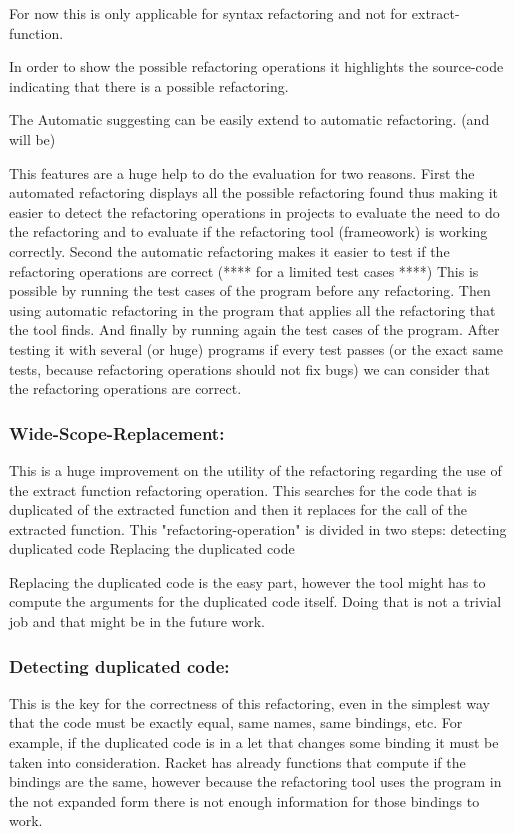 For now this is only applicable for syntax refactoring and not for extract-function.

In order to show the possible refactoring operations it highlights the source-code indicating
that there is a possible refactoring.

The Automatic suggesting can be easily extend to automatic refactoring. (and will be)

This features are a huge help to do the evaluation for two reasons.
First the automated refactoring displays all the possible refactoring found thus making it easier
to detect the refactoring operations in projects to evaluate the need to do the refactoring and to evaluate
if the refactoring tool (frameowork) is working correctly.
Second the automatic refactoring makes it easier to test if the refactoring operations are correct (**** for a limited test cases ****)
This is possible by running the test cases of the program before any refactoring.
Then using automatic refactoring in the program that applies all the refactoring that the tool finds.
And finally by running again the test cases of the program.
After testing it with several (or huge) programs if every test passes (or the exact same tests, because refactoring operations should not fix bugs)
we can consider that the refactoring operations are correct.


\subsubsection{Wide-Scope-Replacement:}
This is a huge improvement on the utility of the refactoring regarding the use
of the extract function refactoring operation. This searches for the code that is
duplicated of the extracted function and then it replaces for the call of the
extracted function.
This "refactoring-operation" is divided in two steps:
detecting duplicated code
Replacing the duplicated code

Replacing the duplicated code is the easy part, however the tool might has to compute
the arguments for the duplicated code itself. Doing that is not a trivial job and
that might be in the future work.

\subsubsection{Detecting duplicated code:}
This is the key for the correctness of this refactoring, even in the simplest way
that the code must be exactly equal, same names, same bindings, etc.
For example, if the duplicated code is in a let that changes some binding it must
be taken into consideration. Racket has already functions that compute if the bindings
are the same, however because the refactoring tool uses the program in the not expanded
form there is not enough information for those bindings to work.

